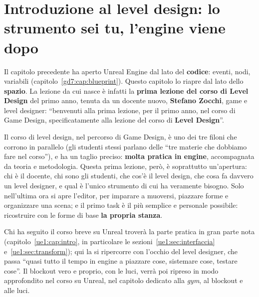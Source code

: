 
\chapter[Introduzione al level design]{Introduzione al level design: lo
strumento sei tu, l'engine viene dopo}
\label{gd8:cap:leveldesign}

Il capitolo precedente ha aperto Unreal Engine dal lato del
\textbf{codice}: eventi, nodi, variabili (capitolo~\ref{gd7:cap:blueprint}).
Questo capitolo lo riapre dal lato dello \textbf{spazio}. La lezione da cui
nasce è infatti la \textbf{prima lezione del corso di Level Design} del primo
anno, tenuta da un docente nuovo, \textbf{Stefano Zocchi}, game e level
designer: ``benvenuti alla prima lezione, per il primo anno, nel corso di Game
Design, specificatamente alla lezione del corso di \textbf{Level Design}''.

Il corso di level design, nel percorso di Game Design, è uno dei tre filoni
che corrono in parallelo (gli studenti stessi parlano delle ``tre materie che
dobbiamo fare nel corso''), e ha un taglio preciso: \textbf{molta pratica in
engine}, accompagnata da teoria e metodologia. Questa prima lezione, però, è
soprattutto un'apertura: chi è il docente, chi sono gli studenti, che cos'è il
level design, che cosa fa davvero un level designer, e qual è l'unico
strumento di cui ha veramente bisogno. Solo nell'ultima ora si apre l'editor,
per imparare a muoversi, piazzare forme e organizzare una scena; e il primo
task è il più semplice e personale possibile: ricostruire con le forme di base
\textbf{la propria stanza}.

Chi ha seguito il corso breve su Unreal troverà la parte pratica in gran parte
nota (capitolo~\ref{ue1:cap:intro}, in particolare le
sezioni~\ref{ue1:sec:interfaccia} e~\ref{ue1:sec:transform}); qui la si
ripercorre con l'occhio del level designer, che passa ``quasi tutto il tempo
in engine a piazzare cose, sistemare cose, testare cose''. Il blockout vero e
proprio, con le luci, verrà poi ripreso in modo approfondito nel corso su
Unreal, nel capitolo dedicato alla \emph{gym}, al blockout e alle luci.

